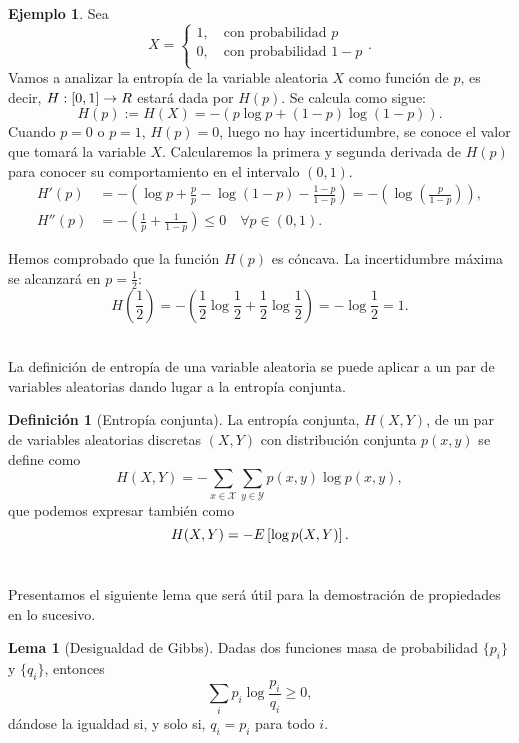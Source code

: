 \documentclass[12pt,a4paper]{report} %
\let\mathbb\relax
\theoremstyle{definition}
\newtheorem{definition}{Definición}[section]
\newtheorem{lemma}[theorem]{Lema}
\newtheorem{example}[theorem]{Ejemplo}
\begin{document}
\begin{example}
  Sea \[X = 
     \begin{cases}
       1, \quad\text{con probabilidad } p\\
       0, \quad\text{con probabilidad } 1-p \\
     \end{cases}.\]
     Vamos a analizar la entropía de la variable aleatoria $X$ como función de $p$, es decir, $H:[0,1]\to \mathbb{R}$ estará dada por $H(p)$. Se calcula como sigue:\[ H(p) := H(X) = - \left ( p \log p + (1-p) \log (1-p) \right ).\]
     Cuando $p=0$ o $p=1$, $H(p) = 0$, luego no hay incertidumbre, se conoce el valor que tomará la variable $X$. Calcularemos la primera y segunda derivada de $H(p)$ para conocer su comportamiento en el intervalo $(0,1)$.
     \begin{align*}
       H'(p) &= - \left ( \log p + \frac{p}{p} - \log(1-p) - \frac{1-p}{1-p} \right ) = - \left ( \log \left (\frac{p}{1-p} \right) \right ),\\
     H''(p) &= - \left ( \frac{1}{p} + \frac{1}{1-p} \right ) \leq 0 \quad \forall p \in (0,1).
     \end{align*}
     
     Hemos comprobado que la función $H(p)$ es cóncava. La incertidumbre máxima se alcanzará en $p=\frac{1}{2}$: \[H\left (\frac{1}{2}\right ) = - \left ( \frac{1}{2}\log\frac{1}{2} + \frac{1}{2} \log\frac{1}{2} \right ) = - \log \frac{1}{2} = 1.\]\\[-10pt]
\end{example}


La definición de entropía de una variable aleatoria se puede aplicar a un par de variables aleatorias dando lugar a la entropía conjunta.\\

\begin{definition}[Entropía conjunta]
  La entropía conjunta, $H(X,Y)$, de un par de variables aleatorias discretas $(X,Y)$ con distribución conjunta $p(x,y)$ se define como \[
  H(X,Y) = - \sum_{x \in \mathcal{X}} \sum_{y \in \mathcal{Y}} p(x,y) \log p(x,y), \]
  que podemos expresar también como \[
  H(X,Y) = - \E \left[\log p(X,Y)\right].\]\\[-10pt]
\end{definition}

Presentamos el siguiente lema que será útil para la demostración de propiedades en lo sucesivo.\\

\begin{lemma}[Desigualdad de Gibbs]\label{l:gibbs}
  Dadas dos funciones masa de probabilidad $\{p_i\}$ y $\{q_i\}$, entonces \[
\sum_i p_i \log \frac{p_i}{q_i} \ge 0,
\]
dándose la igualdad si, y solo si, $q_i = p_i$ para todo $i$.
\end{lemma}
\end{document}
